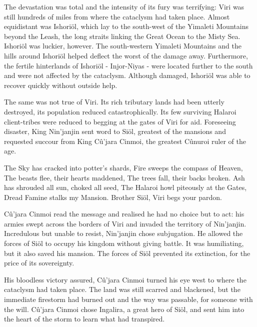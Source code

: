 \documentclass[]{book}
\begin{document}
The devastation was total and the intensity of its fury was terrifying: Viri was still
hundreds of miles from where the cataclysm had taken place. Almost equidistant was
Ishoriöl, which lay to the south-west of the Yimaleti Mountains beyond the Leash, the
long straits linking the Great Ocean to the Misty Sea. Ishoriöl was luckier, however.
The south-western Yimaleti Mountains and the hills around Ishoriöl helped deflect the worst of the damage away. Furthermore, the fertile hinterlands of Ishoriöl - Injor-Niyas -
were located further to the south and were not affected by the cataclysm. Although
damaged, Ishoriöl was able to recover quickly without outside help.

The same was not true of Viri. Its rich tributary lands had been utterly destroyed, its
population reduced catastrophically. Its few surviving Halaroi client-tribes were reduced
to begging at the gates of Viri for aid. Foreseeing disaster, King Nin'janjin sent word to
Siöl, greatest of the mansions and requested succour from King Cû'jara Cinmoi, the
greatest Cûnuroi ruler of the age.

The Sky has cracked into potter's shards,
Fire sweeps the compass of Heaven,
The beasts flee, their hearts maddened,
The trees fall, their backs broken.
Ash has shrouded all sun, choked all seed,
The Halaroi howl piteously at the Gates,
Dread Famine stalks my Mansion.
Brother Siöl, Viri begs your pardon.

Cû'jara Cinmoi read the message and realised he had no choice but to act: his armies
swept across the borders of Viri and invaded the territory of Nin'janjin. Incredulous but
unable to resist, Nin'janjin chose subjugation. He allowed the forces of Siöl to occupy
his kingdom without giving battle. It was humiliating, but it also saved his mansion.
The forces of Siöl prevented its extinction, for the price of its sovereignty.

His bloodless victory assured, Cû'jara Cinmoi turned his eye west to where the
cataclysm had taken place. The land was still scarred and blackened, but the immediate
firestorm had burned out and the way was passable, for someone with the will. Cû'jara
Cinmoi chose Ingalira, a great hero of Siöl, and sent him into the heart of the storm to
learn what had transpired.
\end{document}
